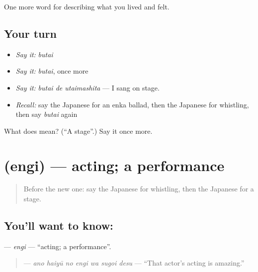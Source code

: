 \begin{grammarlens}[title={What you've built}]
One more word for describing what you lived and felt.
\end{grammarlens}

\subsection*{Your turn}
\begin{itemize}
\raggedright
  \item \emph{Say it:} \emph{butai}
  \item \emph{Say it:} \emph{butai}, once more
  \item \emph{Say it:} \emph{butai de utaimashita} — I sang on stage.
  \item \emph{Recall:} say the Japanese for an enka ballad, then the Japanese for whistling, then say \emph{butai} again
\end{itemize}

\begin{tcolorbox}[breakable,colback=teal!4,colframe=teal!35!black,title={Before you move on}]
What does  mean? (\textquotedblleft{}A stage\textquotedblright{}.) Say it once more.
\end{tcolorbox}
\section[\texorpdfstring{\ja{えんぎ} (engi)}{えんぎ (engi)}]{ (engi) — acting; a performance}

\label{lesson:JA-C471-engi}



\begin{quote}
Before the new one: say the Japanese for whistling, then the Japanese for a stage.
\end{quote}

\subsection*{You'll want to know: }
\textbf{} — \emph{engi} — \textquotedblleft{}acting; a performance\textquotedblright{}.

\begin{quote}
\textbf{   } — \emph{ano haiyū no engi wa sugoi desu} — \textquotedblleft{}That actor's acting is amazing.\textquotedblright{}
\end{quote}

